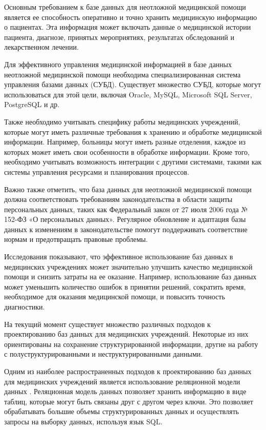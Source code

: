 Основным требованием к базе данных для неотложной медицинской помощи является ее способность оперативно и точно хранить медицинскую информацию о пациентах. Эта информация может включать данные о медицинской истории пациента, диагнозе, принятых мероприятиях, результатах обследований и лекарственном лечении.

Для эффективного управления медицинской информацией в базе данных неотложной медицинской помощи необходима специализированная система управления базами данных (СУБД). Существует множество СУБД, которые могут использоваться для этой цели, включая Oracle, MySQL, Microsoft SQL Server, PostgreSQL и др.

Также необходимо учитывать специфику работы медицинских учреждений, которые могут иметь различные требования к хранению и обработке медицинской информации. Например, больницы могут иметь разные отделения, каждое из которых может иметь свои особенности в обработке информации. Кроме того, необходимо учитывать возможность интеграции с другими системами, такими как системы управления ресурсами и планирования процессов.

Важно также отметить, что база данных для неотложной медицинской помощи должна соответствовать требованиям законодательства в области защиты персональных данных, таких как Федеральный закон от 27 июля 2006 года № 152-ФЗ «О персональных данных». Регулярное обновление и адаптация базы данных к изменениям в законодательстве помогут поддерживать соответствие нормам и предотвращать правовые проблемы.

Исследования показывают, что эффективное использование баз данных в медицинских учреждениях может значительно улучшить качество медицинской помощи и снизить затраты на ее оказание. Например, использование баз данных может уменьшить количество ошибок в принятии решений, сократить время, необходимое для оказания медицинской помощи, и повысить точность диагностики.

На текущий момент существует множество различных подходов к проектированию баз данных для медицинских учреждений. Некоторые из них ориентированы на сохранение структурированной информации, другие на работу с полуструктурированными и неструктурированными данными.

Одним из наиболее распространенных подходов к проектированию баз данных для медицинских учреждений является использование реляционной модели данных \cite{book6}. Реляционная модель данных позволяет хранить информацию в виде таблиц, которые могут быть связаны друг с другом через ключи. Это позволяет обрабатывать большие объемы структурированных данных и осуществлять запросы на выборку данных, используя язык SQL.

